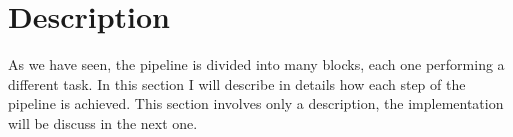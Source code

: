 
	
	\section{Description}
	
	As we have seen, the pipeline is divided into many blocks, each one performing a different task. In this section I will describe in details how each step of the pipeline is achieved. This section involves only a description, the implementation will be discuss in the next one.
	
	
	
